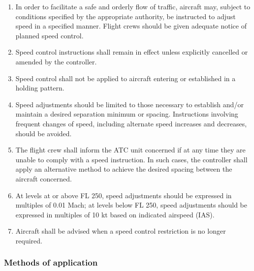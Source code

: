 \documentclass[../vATM.tex]{subfiles}
\begin{document}
    \begin{enumerate}
        \item In order to facilitate a safe and orderly flow of traffic, aircraft may, subject to conditions specified by the appropriate authority, be instructed to adjust speed in a specified manner. Flight crews should be given adequate notice of planned speed control.
        \item Speed control instructions shall remain in effect unless explicitly cancelled or amended by the controller.
        \item Speed control shall not be applied to aircraft entering or established in a holding pattern.
        \item Speed adjustments should be limited to those necessary to establish and/or maintain a desired separation minimum or spacing. Instructions involving frequent changes of speed, including alternate speed increases and decreases, should be avoided.
        \item The flight crew shall inform the ATC unit concerned if at any time they are unable to comply with a speed instruction. In such cases, the controller shall apply an alternative method to achieve the desired spacing between the aircraft concerned.
        \item At levels at or above FL 250, speed adjustments should be expressed in multiples of 0.01 Mach; at levels below FL 250, speed adjustments should be expressed in multiples of 10 kt based on indicated airspeed (IAS).
        \item Aircraft shall be advised when a speed control restriction is no longer required.
    \end{enumerate}

    \subsubsection{Methods of application}
\end{document}
